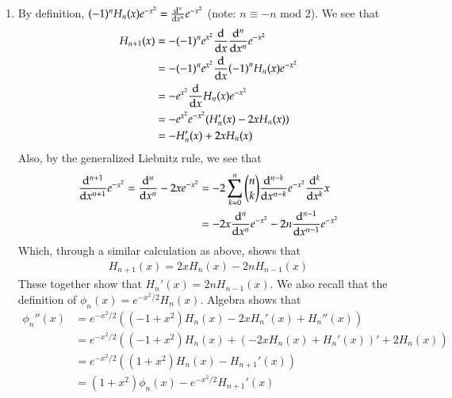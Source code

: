 \documentclass[12pt]{article}
\theoremstyle{definition}
\theoremstyle{remark}
\begin{document}
\begin{enumerate}[leftmargin=\labelsep]
\begin{align*}
			e^{-t^2/2} (-1)^n \int_{-\infty}^{\infty} e^{x^2/2} e^{itx}  e^{-x^2}H_n(x)dx &= e^{-t^2/2} (-1)^n \int_{-\infty}^{\infty}  e^{itx} e^{-x^2/2} H_n(x)dx \\
			&= e^{-t^2/2} (-1)^n \int_{-\infty}^{\infty} \phi_n(x) e^{itx}dx
		\end{align*}
		We conclude that
		\begin{align*}
			e^{-t^2/2} (-1)^n \int_{-\infty}^{\infty} \phi_n(x) e^{itx}dx &= (-i)^n \sqrt{2\pi} (-1)^n e^{-t^2} H_n(t) \\
			\implies \frac{1}{\sqrt{2\pi}} \int_{-\infty}^{\infty} \phi_n(x) e^{itx}dx &= (-i)^n e^{-t^2/2} H_n(t) = (-i)^n \phi_n(t)
		\end{align*}
		And we are done. $\hfill$ Q.E.MF'n.D.
		
		\item By definition, $(-1)^n H_n(x)e^{-x^2} = \dv[n]{x} e^{-x^2}$ (note: $n \equiv -n$ mod 2). We see that
		\begin{align*}
			H_{n+1}(x) &= - (-1)^n e^{x^2} \dv{x} \dv[n]{x} e^{-x^2} \\
			&= - (-1)^n e^{x^2} \dv{x}(-1)^n H_n(x)e^{-x^2} \\
			&= -e^{x^2} \dv{x}H_n(x)e^{-x^2} \\
			&= -e^{x^2} e^{-x^2} (H_n'(x) - 2xH_n(x)) \\
			&= -H_n'(x) + 2xH_n(x)
		\end{align*}
		Also, by the generalized Liebnitz rule, we see that
		\begin{align*}
			\dv[n+1]{x} e^{-x^2} = \dv[n]{x} -2xe^{-x^2} &= -2 \sum_{k=0}^n {n \choose k} \dv[n-k]{x} e^{-x^2} \dv[k]{x} x \\
			&= -2x\dv[n]{x} e^{-x^2} -2n\dv[n-1]{x} e^{-x^2}
		\end{align*}
		Which, through a similar calculation as above, shows that
		\begin{align*}
			H_{n+1}(x) = 2xH_n(x) - 2nH_{n-1}(x)
		\end{align*}
		These together show that $H_n'(x) = 2nH_{n-1}(x)$. We also recall that the definition of $\phi_n(x) = e^{-x^2/2}H_n(x)$. Algebra shows that
		\begin{align*}
			 \phi_n''(x) &= e^{-x^2/2}((-1+x^2)H_n(x) - 2xH_n'(x) + H_n''(x)) \\
			 &= e^{-x^2/2}((-1+x^2)H_n(x) + (-2xH_n(x) + H_n'(x))' + 2H_n(x)) \\
			 &= e^{-x^2/2}((1+x^2)H_n(x) - H_{n+1}'(x)) \\
			 &= (1+x^2)\phi_n(x) - e^{-x^2/2}H_{n+1}'(x) \\

\end{align*}
\end{enumerate}
\end{document}
